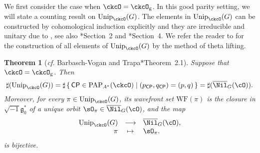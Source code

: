 \documentclass[12pt,a4paper]{amsart}
\newcommand{\trivial}[2][]{\if\relax\detokenize{#1}\relax
  {%
      \color{orange} \vspace{0em} $[$  #2 $]$
      \color{black}
  }
  \else
\ifx#1h
\ifcsname showtrivial\endcsname
{%
    \color{orange} \vspace{0em}  $[$ #2 $]$
    \color{black}
}
\fi
\else {\red Wrong argument!} \fi
\fi
}
\newcommand{\WF}{\mathrm{WF}}
\newcommand{\CP}{{\mathcal {P}}}
\newcommand{\g}{\mathfrak g}
\numberwithin{equation}{section}
\newtheorem{thm}{Theorem}[section]
\theoremstyle{remark}
\def\cf{\emph{cf.} }
\def\Unip{\mathrm{Unip}}
\def\CP{\mathsf{CP}}
\def\Cint#1{\Coh_{[#1]}}
\def\Coh{\mathrm{Coh}}
\begin{document}
We first consider the case when  $\ckcO = \ckcO_{\mathrm g}$.
In this good parity setting, we will state a counting result on
$\Unip_{\ckcO}(G)$. The elements in $\Unip_{\ckcO}(G)$ can be constructed by
cohomological induction explicitly and they are irreducible and unitary due to
\cite{Mat96,Tr.U}, see also \cite{Tr.H}*{Section~2} and \cite{MR.U}*{Section~4}.
We refer the reader to \cite{BMSZ2} for the construction of all elements of $\Unip_{\ckcO}(G)$ by the method of theta lifting.


\begin{thm}[\cf {Barbasch-Vogan\cite{BV.W} and Trapa\cite{Tr.H}*{Theorem~2.1}}]\label{thmunit0}
  Suppose that $\ckcO = \ckcO_{\mathrm g}$. Then
  \begin{equation} \label{sharpuni0} \sharp(\Unip_{\ckcO}(G))= \sharp \set{\CP\in \mathrm{PAP}_{A^*}(\ckcO)|(p_\CP, q_\CP)=(p,q)}=\sharp(\overline \Nil_{G}(\cO)).
  \end{equation}
  Moreover, for every $\pi\in \Unip_{\ckcO}(G)$, its wavefront set $\WF(\pi)$ is
  the closure in $\sqrt{-1}\g_0^*$ of a unique orbit
  $\sO_\pi\in \overline \Nil_{G}(\cO)$, and the map
  \begin{equation}\label{sharpuni1}
    \begin{array}{rcl}
      \Unip_{\ckcO}(G) &\longrightarrow& \overline \Nil_{G}(\cO), \\%
      \pi & \mapsto & \sO_\pi.
    \end{array}
  \end{equation}
  is bijective.
\end{thm}
\end{document}
